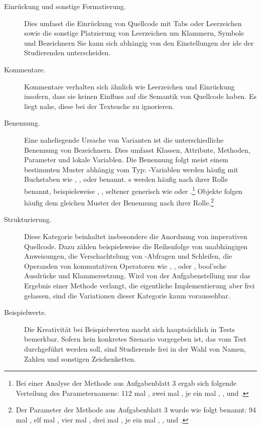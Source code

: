 \begin{description}
    \item[Einrückung und sonstige Formatierung.]
    Dies umfasst die Einrückung von Quellcode mit Tabs oder Leerzeichen sowie die sonstige Platzierung von Leerzeichen um Klammern, Symbole und Bezeichnern
    Sie kann sich abhängig von den Einstellungen der \ac{ide} der Studierenden unterscheiden.
    \item[Kommentare.]
    Kommentare verhalten sich ähnlich wie Leerzeichen und Einrückung insofern, dass sie keinen Einfluss auf die Semantik von Quellcode haben.
    Es liegt nahe, diese bei der Textsuche zu ignorieren.
    \item[Benennung.]
    Eine naheliegende Ursache von Varianten ist die unterschiedliche Benennung von Bezeichnern.
    Dies umfasst Klassen, Attribute, Methoden, Parameter und lokale Variablen.
    Die Benennung folgt meist einem bestimmten Muster abhängig vom Typ:
    -Variablen werden häufig mit Buchstaben wie , ,  oder  benannt.
    s werden häufig nach ihrer Rolle benannt, beispielsweise , , seltener generisch wie  oder .\footnote{
        Bei einer Analyse der Methode  aus Aufgabenblatt 3 ergab sich folgende Verteilung des Parameternamens:
        112 mal , zwei mal , je ein mal , \sic,  und .\label{fn:setPhase}
    }
    Objekte folgen häufig dem gleichen Muster der Benennung nach ihrer Rolle.\footnote{
        Der Parameter der Methode  aus Aufgabenblatt 3 wurde wie folgt benannt:
        94 mal , elf mal , vier mal , drei mal , je ein mal , , \sic und .\label{fn:setWinner}
    }
    \item[Strukturierung.]
    Diese Kategorie beinhaltet insbesondere die Anordnung von imperativen Quellcode.
    Dazu zählen beispielsweise die Reihenfolge von unabhängigen Anweisungen, die Verschachtelung von -Abfragen und Schleifen, die Operanden von kommutativen Operatoren wie \code{+}, \code{*}, \code{&&} oder \code{||}, bool'sche Ausdrücke und Klammersetzung.
    Wird von der Aufgabenstellung nur das Ergebnis einer Methode verlangt, die eigentliche Implementierung aber frei gelassen, sind die Variationen dieser Kategorie kaum voraussehbar.
    \item[Beispielwerte.]
    Die Kreativität bei Beispielwerten macht sich hauptsächlich in Tests bemerkbar.
    Sofern kein konkretes Szenario vorgegeben ist, das vom Test durchgeführt werden soll, sind Studierende frei in der Wahl von Namen, Zahlen und sonstigen Zeichenketten.
\end{description}

